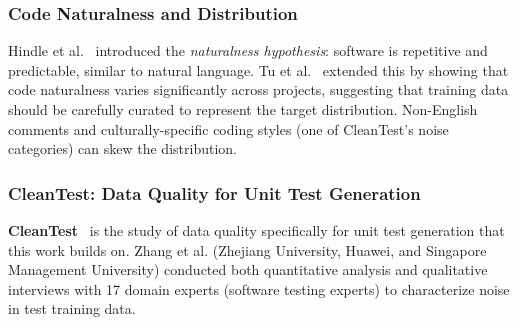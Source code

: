 \documentclass[acmlarge,nonacm,screen]{acmart}
\begin{document}
\subsubsection{Code Naturalness and Distribution}

Hindle et al.~\cite{hindle2016naturalness} introduced the \textit{naturalness hypothesis}: software is repetitive and predictable, similar to natural language. Tu et al.~\cite{tu2014localness} extended this by showing that code naturalness varies significantly across projects, suggesting that training data should be carefully curated to represent the target distribution. Non-English comments and culturally-specific coding styles (one of CleanTest's noise categories) can skew the distribution.

\subsubsection{CleanTest: Data Quality for Unit Test Generation}

\textbf{CleanTest}~\cite{zhang2025cleantest} is the study of data quality specifically for unit test generation that this work builds on. Zhang et al. (Zhejiang University, Huawei, and Singapore Management University) conducted both quantitative analysis and qualitative interviews with 17 domain experts (software testing experts) to characterize noise in test training data.
\end{document}
